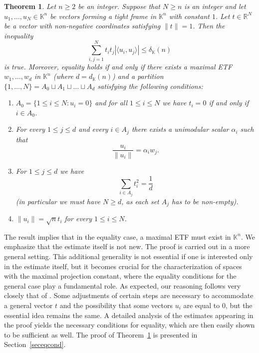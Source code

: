 \documentclass[12pt, reqno]{amsart}
\newtheorem{twr}{Theorem}[section]
\theoremstyle{definition}
\theoremstyle{remark}
\numberwithin{equation}{section}
\begin{document}
\begin{twr}
\label{twrbound}
Let $n \geq 2$ be an integer. Suppose that $N \geq n$ is an integer and let $u_1, \ldots, u_N \in \mathbb{K}^n$ be vectors forming a tight frame in $\mathbb{K}^n$ with constant $1$. Let $t \in \mathbb{R}^N$ be a vector with non-negative coordinates satisfying $\|t\|=1$. Then the inequality
$$\sum_{i, j=1}^{N} t_it_j |\langle u_i, u_j \rangle| \leq \delta_{\mathbb{K}}(n)$$
is true. Moreover, equality holds if and only if there exists a maximal ETF $w_1, \ldots, w_{d}$ in $\mathbb{K}^n$ (where $d=d_{\mathbb{K}}(n)$) and a partition $\{1, \ldots, N\} = A_0 \sqcup A_1 \sqcup \ldots \sqcup A_d$ satisfying the following conditions:
\begin{enumerate}
\item $A_0 = \{1 \leq i \leq N: u_i=0\}$ and for all $1 \leq i \leq N$ we have $t_i=0$ if and only if $i \in A_0$.
\item For every $1 \leq j \leq d$ and every $i \in A_j$ there exists a unimodular scalar $\alpha_i$ such that 
$$\frac{u_i}{\|u_i\|} = \alpha_i w_j.$$
\item For $1 \leq j \leq d$ we have
$$\sum_{i \in A_j} t_i^2 = \frac{1}{d}$$
(in particular we must have $N \geq d$, as each set $A_j$ has to be non-empty).
\item $\|u_i\|=\sqrt{n}t_i$ for every $1 \leq i \leq N$.
\end{enumerate}
\end{twr}
The result implies that in the equality case, a maximal ETF must exist in $\mathbb{K}^n$. We emphasize that the estimate itself is not new. The proof is carried out in a more general setting. This additional generality is not essential if one is interested only in the estimate itself, but it becomes crucial for the characterization of spaces with the maximal projection constant, where the equality conditions for the general case play a fundamental role. As expected, our reasoning follows very closely that of \cite{deregowskalewandowska}. Some adjustments of certain steps are necessary to accommodate a general vector $t$ and the possibility that some vectors $u_i$ are equal to $0$, but the essential idea remains the same. A detailed analysis of the estimates appearing in the proof yields the necessary conditions for equality, which are then easily shown to be sufficient as well. The proof of Theorem~\ref{twrbound} is presented in Section~\ref{seceqcond}.
\end{document}
